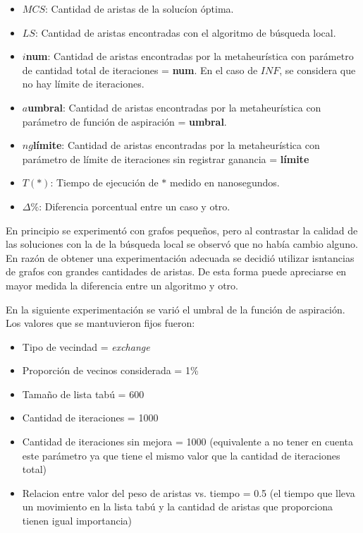\begin{itemize}
\item $MCS$: Cantidad de aristas de la solucíon óptima.
\item $LS$: Cantidad de aristas encontradas con el algoritmo de búsqueda
local.
\item $i$\textbf{num}: Cantidad de aristas encontradas por la metaheurística
con parámetro de cantidad total de iteraciones = \textbf{num}. En el caso de
$INF$, se considera que no hay límite de iteraciones.
\item $a$\textbf{umbral}: Cantidad de aristas encontradas por la
metaheurística con parámetro de función de aspiración = \textbf{umbral}.
\item $ng$\textbf{límite}: Cantidad de aristas encontradas por la
metaheurística con parámetro de límite de iteraciones sin registrar ganancia =
\textbf{límite}
\item $T(*)$: Tiempo de ejecución de $*$ medido en nanosegundos.
\item $\Delta \%$: Diferencia porcentual entre un caso y otro.
\end{itemize}

En principio se experimentó con grafos pequeños, pero al contrastar la calidad
de las soluciones con la de la búsqueda local se observó que no había cambio
alguno. En razón de obtener una experimentación adecuada se decidió utilizar
isntancias de grafos con grandes cantidades de aristas. De esta forma puede
apreciarse en mayor medida la diferencia entre un algoritmo y otro.

En la siguiente experimentación se varió el umbral de la función de
aspiración. Los valores que se mantuvieron fijos fueron:

\begin{itemize}
\item Tipo de vecindad = \textit{exchange}
\item Proporción de vecinos considerada = 1\%
\item Tamaño de lista tabú = 600
\item Cantidad de iteraciones = 1000
\item Cantidad de iteraciones sin mejora = 1000 (equivalente a no tener en
cuenta este parámetro ya que tiene el mismo valor que la cantidad de
iteraciones total)
\item Relacion entre valor del peso de aristas vs. tiempo = 0.5 (el tiempo que
lleva un movimiento en la lista tabú y la cantidad de aristas que proporciona
tienen igual importancia)
\end{itemize}

